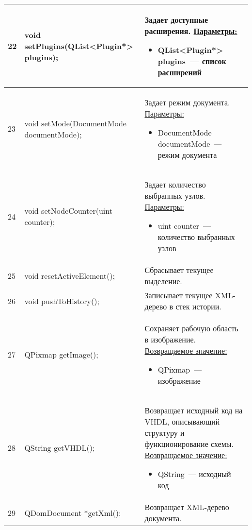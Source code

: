 \begin{longtable}[h]{|p{}|p{}|p{}|}
  22 & void        setPlugins(QList<Plugin*> plugins); & Задает доступные расширения.\newline
    \uline{Параметры:}
    \begin{itemize}[nolistsep,label=,leftmargin=0cm]
      \item QList<Plugin*> plugins~--- список расширений
    \end{itemize}\\ \hline
  23 & void setMode(DocumentMode documentMode); & Задает режим документа.\newline
    \uline{Параметры:}
    \begin{itemize}[nolistsep,label=,leftmargin=0cm]
      \item DocumentMode documentMode~--- режим документа
    \end{itemize}\\ \hline
  24 & void setNodeCounter(uint counter); & Задает количество выбранных узлов.\newline
    \uline{Параметры:}
    \begin{itemize}[nolistsep,label=,leftmargin=0cm]
      \item uint counter~--- количество выбранных узлов
    \end{itemize}\\ \hline
  25 & void resetActiveElement(); & Сбрасывает текущее выделение.\\ \hline
  26 & void pushToHistory(); & Записывает текущее XML-дерево в стек истории.\\ \hline
  27 & QPixmap       getImage(); & Сохраняет рабочую область в изображение.\newline
    \uline{Возвращаемое значение:}
    \begin{itemize}[nolistsep,label=,leftmargin=0cm]
      \item QPixmap~--- изображение
    \end{itemize}\\ \hline
  28 & QString       getVHDL(); & Возвращает исходный код на VHDL, описывающий структуру и функционирование схемы.\newline
    \uline{Возвращаемое значение:}
    \begin{itemize}[nolistsep,label=,leftmargin=0cm]
      \item QString~--- исходный код
    \end{itemize}\\ \hline
  29 & QDomDocument *getXml(); & Возвращает XML-дерево документа.\newline

\end{longtable}

